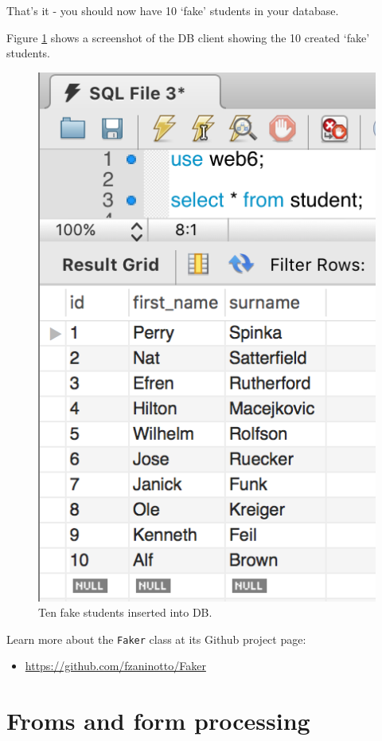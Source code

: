 \documentclass[a4paperpaper,openright]{book}
\providecommand{\tightlist}{%
  \setlength{\itemsep}{0pt}\setlength{\parskip}{0pt}}
\begin{document}
That's it - you should now have 10 `fake' students in your database.

Figure \ref{fake_students} shows a screenshot of the DB client showing
the 10 created `fake' students.

\begin{figure}
\centering
\includegraphics{./tex2pdf.-65f13e14688ab55b/7031b6bf5e162a6ef9ab7d3ff115b3c0a2ca96cc.png}
\caption{Ten fake students inserted into DB. \label{fake_students}}
\end{figure}

Learn more about the \texttt{Faker} class at its Github project page:

\begin{itemize}
\tightlist
\item
  \url{https://github.com/fzaninotto/Faker}
\end{itemize}

\part{Froms and form processing}
\end{document}
